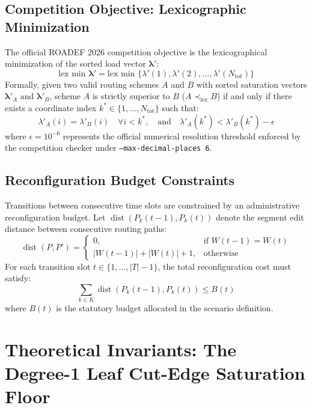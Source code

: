 \documentclass[10pt,journal,compsoc]{IEEEtran}
\begin{document}
\subsection{Competition Objective: Lexicographic Minimization}
The official ROADEF 2026 competition objective is the lexicographical minimization of the sorted load vector $\boldsymbol{\lambda}'$:
\begin{equation}
\text{lex min } \boldsymbol{\lambda}' = \text{lex min } \{ \lambda'(1), \lambda'(2), \dots, \lambda'(N_{\text{tot}}) \}
\end{equation}
Formally, given two valid routing schemes $A$ and $B$ with sorted saturation vectors $\boldsymbol{\lambda}'_A$ and $\boldsymbol{\lambda}'_B$, scheme $A$ is strictly superior to $B$ ($A \prec_{\text{lex}} B$) if and only if there exists a coordinate index $k^* \in \{1, \dots, N_{\text{tot}}\}$ such that:
\begin{equation}
\lambda'_A(i) = \lambda'_B(i) \quad \forall i < k^*, \quad \text{and} \quad \lambda'_A(k^*) < \lambda'_B(k^*) - \epsilon
\end{equation}
where $\epsilon = 10^{-6}$ represents the official numerical resolution threshold enforced by the competition checker under \texttt{--max-decimal-places 6}.

\subsection{Reconfiguration Budget Constraints}
Transitions between consecutive time slots are constrained by an administrative reconfiguration budget. Let $\operatorname{dist}(P_k(t-1), P_k(t))$ denote the segment edit distance between consecutive routing paths:
\begin{equation}
\operatorname{dist}(P, P') = 
\begin{cases}
0, & \text{if } W(t-1) = W(t) \\
|W(t-1)| + |W(t)| + 1, & \text{otherwise}
\end{cases}
\end{equation}
For each transition slot $t \in \{1, \dots, |T|-1\}$, the total reconfiguration cost must satisfy:
\begin{equation}
\sum_{k \in K} \operatorname{dist}(P_k(t-1), P_k(t)) \le B(t)
\end{equation}
where $B(t)$ is the statutory budget allocated in the scenario definition.

\section{Theoretical Invariants: The Degree-1 Leaf Cut-Edge Saturation Floor}
\end{document}
